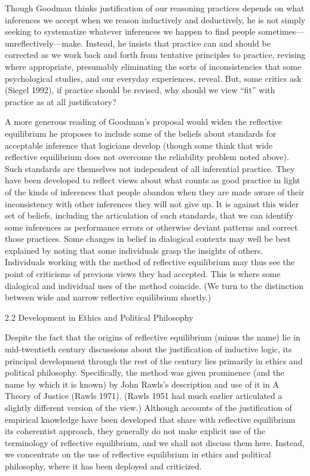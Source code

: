 \documentclass[]{article}
\begin{document}
Though Goodman thinks justification of our reasoning practices depends
on what inferences we accept when we reason inductively and deductively,
he is not simply seeking to systematize whatever inferences we happen to
find people sometimes---unreflectively---make. Instead, he insists that
practice can and should be corrected as we work back and forth from
tentative principles to practice, revising where appropriate, presumably
eliminating the sorts of inconsistencies that some psychological
studies, and our everyday experiences, reveal. But, some critics ask
(Siegel 1992), if practice should be revised, why should we view ``fit''
with practice as at all justificatory?

A more generous reading of Goodman's proposal would widen the reflective
equilibrium he proposes to include some of the beliefs about standards
for acceptable inference that logicians develop (though some think that
wide reflective equilibrium does not overcome the reliability problem
noted above). Such standards are themselves not independent of all
inferential practice. They have been developed to reflect views about
what counts as good practice in light of the kinds of inferences that
people abandon when they are made aware of their inconsistency with
other inferences they will not give up. It is against this wider set of
beliefs, including the articulation of such standards, that we can
identify some inferences as performance errors or otherwise deviant
patterns and correct those practices. Some changes in belief in
dialogical contexts may well be best explained by noting that some
individuals grasp the insights of others. Individuals working with the
method of reflective equilibrium may thus see the point of criticisms of
previous views they had accepted. This is where some dialogical and
individual uses of the method coincide. (We turn to the distinction
between wide and narrow reflective equilibrium shortly.)

\protect\hypertarget{DevEthPol}{}{2.2 Development in Ethics and
Political Philosophy}

Despite the fact that the origins of reflective equilibrium (minus the
name) lie in mid-twentieth century discussions about the justification
of inductive logic, its principal development through the rest of the
century lies primarily in ethics and political philosophy. Specifically,
the method was given prominence (and the name by which it is known) by
John Rawls's description and use of it in A Theory of Justice (Rawls
1971). (Rawls 1951 had much earlier articulated a slightly different
version of the view.) Although accounts of the justification of
empirical knowledge have been developed that share with reflective
equilibrium its coherentist approach, they generally do not make
explicit use of the terminology of reflective equilibrium, and we shall
not discuss them here. Instead, we concentrate on the use of reflective
equilibrium in ethics and political philosophy, where it has been
deployed and criticized.
\end{document}
